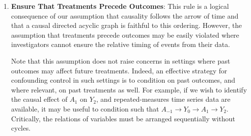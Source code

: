 \documentclass[
  single column]{article}
\begin{document}
\begin{enumerate}
\def\labelenumi{\arabic{enumi}.}
\item
  \textbf{Ensure That Treatments Precede Outcomes}: This rule is a
  logical consequence of our assumption that causality follows the arrow
  of time and that a causal directed acyclic graph is faithful to this
  ordering. However, the assumption that treatments precede outcomes may
  be easily violated where investigators cannot ensure the relative
  timing of events from their data.

  Note that this assumption does not raise concerns in settings where
  past outcomes may affect future treatments. Indeed, an effective
  strategy for confounding control in such settings is to condition on
  past outcomes, and where relevant, on past treatments as well. For
  example, if we wish to identify the causal effect of \(A_1\) on
  \(Y_2\), and repeated-measures time series data are available, it may
  be useful to condition such that
  \(\boxed{A_{-1}} \to \boxed{Y_0} \to A_1 \rightarrow Y_2\).
  Critically, the relations of variables must be arranged sequentially
  without cycles.


\end{enumerate}
\end{document}
